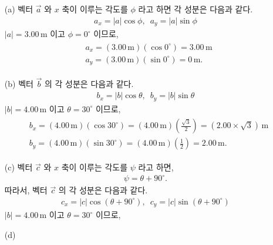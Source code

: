\documentclass[floatfix,nofootinbib,superscriptaddress,fleqn,preprint]{revtex4}
\begin{document}
\vspace{1 cm}
\begin{itemize}
  \item[(a)] 벡터 $\vec{a}$ 와 $x$ 축이 이루는 각도를 $\phi$ 라고 하면 각 성분은 다음과 같다.
  \begin{align}
    a_x = |a|\cos{\phi},\,\,\,a_y = |a|\sin{\phi}
  \end{align}
  $|a|=3.00\,\mathrm{m}$ 이고 $\phi = 0^\circ$ 이므로,
  \begin{align}
    \begin{split}
    &a_x = (3.00\,\mathrm{m})(\cos{0^\circ}) =3.00\,\mathrm{m}   \\
    &a_y = (3.00\,\mathrm{m})(\sin{0^\circ})=0\,\mathrm{m}.
    \end{split}
  \end{align}
  \item[(b)] 벡터 $\vec{b}$ 의 각 성분은 다음과 같다.
  \begin{align}
    b_x = |b|\cos{\theta},\,\,\,b_y = |b|\sin{\theta}
  \end{align}
  $|b|=4.00\,\mathrm{m}$ 이고 $\theta = 30^\circ$ 이므로,
  \begin{align}
    \begin{split}
      &b_x = (4.00\,\mathrm{m})(\cos{30^\circ}) 
      =(4.00\,\mathrm{m})\left(\frac{\sqrt{3}}{2}\right)
      =(2.00\times\sqrt{3})\,\mathrm{m}\\
      &b_y = (4.00\,\mathrm{m})(\sin{30^\circ})
      =(4.00\,\mathrm{m})\left(\frac{1}{2}\right)
      =2.00\,\mathrm{m}.
    \end{split}
  \end{align}
  \item[(c)] 벡터 $\vec{c}$ 와 $x$ 축이 이루는 각도를 $\psi$ 라고 하면,
  \begin{align}
    \psi = \theta + 90^{\circ}.
  \end{align}
  따라서, 벡터 $\vec{c}$ 의 각 성분은 다음과 같다.
  \begin{align}
    c_x = |c|\cos{(\theta + 90^{\circ})},\,\,\,c_y = |c|\sin{(\theta + 90^{\circ})}
  \end{align}
  $|b|=4.00\,\mathrm{m}$ 이고 $\theta = 30^\circ$ 이므로,
  \item[(d)] 
\end{itemize}
\end{document}
